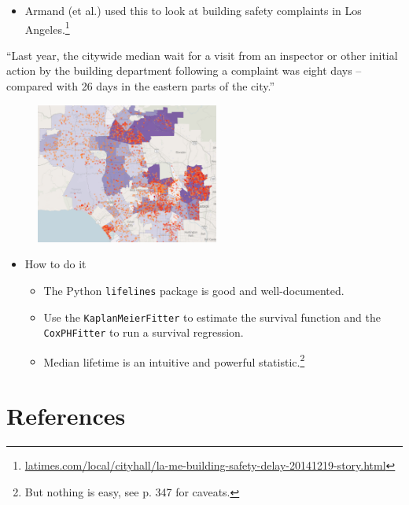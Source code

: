 \documentclass{beamer}
\begin{document}
\begin{frame}
	\begin{itemize}
		\item Armand (et al.) used this to look at building safety complaints in Los Angeles.\footnote{\url{latimes.com/local/cityhall/la-me-building-safety-delay-20141219-story.html}}
	\end{itemize}
	\begin{displayquote}
		``Last year, the citywide median wait for a visit from an inspector or other initial action by the building department following a complaint was eight days -- compared with 26 days in the eastern parts of the city.''
	\end{displayquote}
	\begin{figure}
		\includegraphics[width=6cm]{latimes-complaints.png}
		\centering
	\end{figure}
\end{frame}

\begin{frame}
	\begin{itemize}
		\item How to do it
		\begin{itemize}
			\item The Python \texttt{lifelines} package is good and well-documented.
			\item Use the \texttt{KaplanMeierFitter} to estimate the survival function and the \texttt{CoxPHFitter} to run a survival regression.
			\item Median lifetime is an intuitive and powerful statistic.\footnote{But nothing is easy, see \cite{singer2003describing} p. 347 for caveats.}
		\end{itemize}
	\end{itemize}
\end{frame}

\section{References}

\begin{frame}[allowframebreaks]
        
        
\end{frame}
\end{document}
